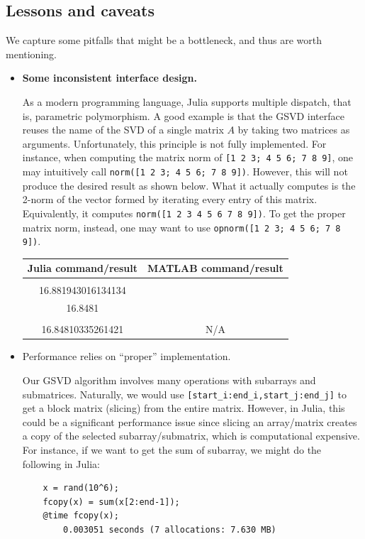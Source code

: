 \subsection{Lessons and caveats} 
We capture some pitfalls that might be a bottleneck, 
and thus are worth mentioning.
\begin{itemize} 

\item {\bf Some inconsistent interface design.}

As a modern programming language, Julia supports multiple dispatch, that is, parametric polymorphism. A good example is that the GSVD interface reuses the name of the SVD of a single matrix $A$ by taking two matrices as arguments. Unfortunately, this principle is not fully implemented. For instance, when computing the matrix norm of {\tt [1 2 3; 4 5 6; 7 8 9]}, one may intuitively call \texttt{norm([1 2 3; 4 5 6; 7 8 9])}. However, this will not produce the desired result as shown below. What it actually computes is the 2-norm of the vector formed by iterating every entry of this matrix. Equivalently, it computes {\tt norm([1 2 3 4 5 6 7 8 9])}. To get the proper matrix norm, instead, one may want to use \texttt{opnorm([1 2 3; 4 5 6; 7 8 9])}. 

\begin{table}[H]
\centering
\begin{tabular}{|| c | c ||} \hline
Julia command/result & MATLAB command/result\\ [0.5ex] \hline\hline
\makecell{\texttt{norm([1 2 3; 4 5 6; 7 8 9])} \\
16.881943016134134} & \makecell{\texttt{norm([1 2 3;4 5 6;7 8 9])} \\ 16.8481} \\
\hline\hline
\makecell{\texttt{opnorm([1 2 3; 4 5 6; 7 8 9])} \\
16.84810335261421} & N/A \\
\hline\hline
\end{tabular}
\label{norm-api}
\end{table}

\item {Performance relies on ``proper'' implementation.}

Our GSVD algorithm involves many operations with subarrays and submatrices. Naturally, we would use {\tt [start\_i:end\_i,start\_j:end\_j]} to get a block matrix (slicing) from the entire matrix. However, in Julia, this could be a significant performance issue since slicing an array/matrix creates a copy of the selected subarray/submatrix, which is computational expensive. For instance, if we want to get the sum of subarray, we might do the following in Julia:  
\begin{verbatim}
    x = rand(10^6);
    fcopy(x) = sum(x[2:end-1]);
    @time fcopy(x);
  	    0.003051 seconds (7 allocations: 7.630 MB)
\end{verbatim}


\end{itemize}
